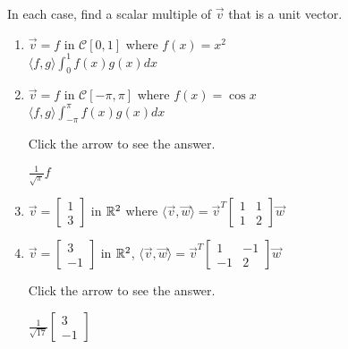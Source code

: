 \documentclass{ximera}
\begin{document}
\begin{problem}\label{prob:inner_prod_3}
In each case, find a scalar multiple of $\vec{v}$ that is a unit vector.

\begin{enumerate} 
\item $\vec{v} = f$ in $\mathcal{C}[0, 1]$ where
$f(x) = x^2$  \\ $\langle f, g \rangle \int_{0}^{1} f(x)g(x)dx$

\item $\vec{v} = f$ in $\mathcal{C}[-\pi, \pi]$ where
$f(x) = \cos x$ \\ $\langle f, g \rangle \int_{-\pi}^{\pi} f(x)g(x)dx$

Click the arrow to see the answer.
\begin{expandable}{}{}
$\frac{1}{\sqrt{\pi}}f$
\end{expandable}

\item $\vec{v} =
\left[ \begin{array}{r}
1 \\
3
\end{array} \right]$
in $\mathbb{R}^2$ where $\langle \vec{v}, \vec{w} \rangle = \vec{v}^T
\left[ \begin{array}{rr}
1 & 1 \\
1 & 2
\end{array} \right]
\vec{w}$

\item $ \vec{v} =
\left[ \begin{array}{r}
3 \\
-1
\end{array} \right]$
in $\mathbb{R}^2$, $\langle \vec{v}, \vec{w} \rangle = \vec{v}^T
\left[ \begin{array}{rr}
1 & -1 \\
-1 & 2
\end{array} \right]
\vec{w}$

Click the arrow to see the answer.
\begin{expandable}{}{}
$\frac{1}{\sqrt{17}}
\left[ \begin{array}{r}
3 \\
-1
\end{array} \right]$
\end{expandable}

\end{enumerate}
\end{problem}
\end{document}
